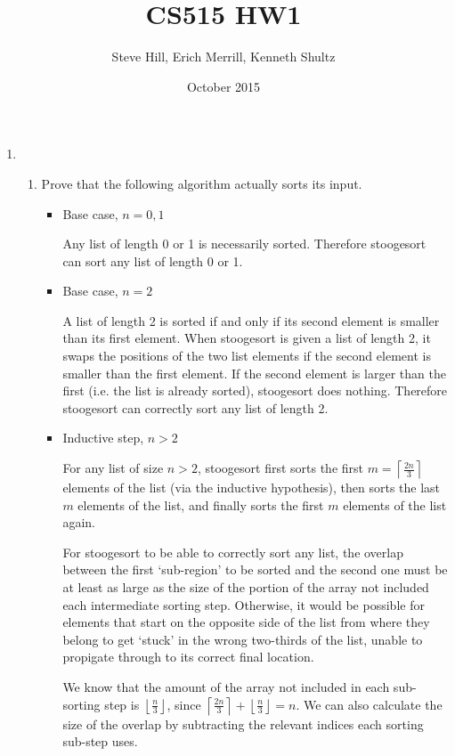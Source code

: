 \documentclass{article}
\title{CS515 HW1}
\author{Steve Hill, Erich Merrill, Kenneth Shultz}
\date{October 2015}
\newcommand{\ceil}[1]{\left\lceil#1\right\rceil}
\newcommand{\floor}[1]{\left\lfloor#1\right\rfloor}
\newcommand{\question}[1]{\bgroup\color{blue}#1\egroup}
\begin{document}
\maketitle

\begin{enumerate}
\item 
    \begin{enumerate}
    \item 
      \question{Prove that the following algorithm actually sorts its input.}

  \begin{itemize}
  \item Base case, $n=0,1$

  Any list of length 0 or 1 is necessarily sorted. Therefore stoogesort can sort any list of length 0 or 1.

  \item Base case, $n=2$

  A list of length 2 is sorted if and only if its second element is smaller than its first element. 
  When stoogesort is given a list of length 2, it swaps the positions of the two list elements if the second element is smaller than the first element. If the second element is larger than the first (i.e. the list is already sorted), stoogesort does nothing.
  Therefore stoogesort can correctly sort any list of length 2.

  \item Inductive step, $n>2$

  For any list of size $n > 2$, stoogesort first sorts the first $m=\ceil{\frac{2n}{3}}$ elements of the list (via the inductive hypothesis), then sorts the last $m$ elements of the list, and finally sorts the first $m$ elements of the list again.
  
  For stoogesort to be able to correctly sort any list, the overlap between the first `sub-region' to be sorted and the second one must be at least as large as the size of the portion of the array not included each intermediate sorting step.
  Otherwise, it would be possible for elements that start on the opposite side of the list from where they belong to get `stuck' in the wrong two-thirds of the list, unable to propigate through to its correct final location.

  We know that the amount of the array not included in each sub-sorting step is $\floor{\frac{n}{3}}$, since $\ceil{\frac{2n}{3}} + \floor{\frac{n}{3}} = n$. We can also calculate the size of the overlap by subtracting the relevant indices each sorting sub-step uses.


\end{itemize}
\end{enumerate}
\end{enumerate}
\end{document}
